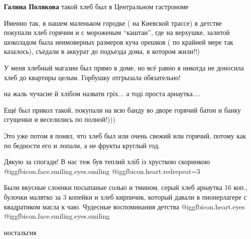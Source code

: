 \begin{itemize}
\textbf{Галина Полякова} такой хлеб был в Центральном гастрономе


Именно так, в нашем маленьком городке ( на Киевской трассе) в детстве покупали
хлеб горячим и с мороженым \enquote{каштан}, где на верхушке, залитой шоколадом была
неимоверных размеров куча орешков ( по крайней мере так казалось), съедали в
аккурат до подъезда дома, в котором жили!!)


У меня хлебный магазин был прямо в доме, но всё равно я никогда не доносила
хлеб до квартиры целым. Горбушку отгрызала обязательно!

на жаль чучасне й хлібом назвати гріх... а тоді проста арнаутка....


Ещё был прикол такой, покупали на всю банду во дворе горячий батон и банку
сгущенки и веселились по полной!)))

Это уже потом я понял, что хлеб был или очень свежий или горячий, потому как по
бедности его и лопали, а не фрукты круглый год.

Дякую за спогади! В нас теж був теплий хліб із хрусткою скоринкою @igg{fbicon.face.smiling.eyes.smiling} 
@igg{fbicon.heart.red}{repeat=3}


Были вкусные слоенки посыпаные солью и тмином, серый хлеб арнаутка 16 коп.,
булочки малятко за 3 копейки и хлеб кирпичик, который давали в пионерлагере с
квадратиком масла к чаю. Чудесные воспоминания детства  @igg{fbicon.heart.eyes}  @igg{fbicon.face.smiling.eyes.smiling} 


ностальгия

\end{itemize} %
